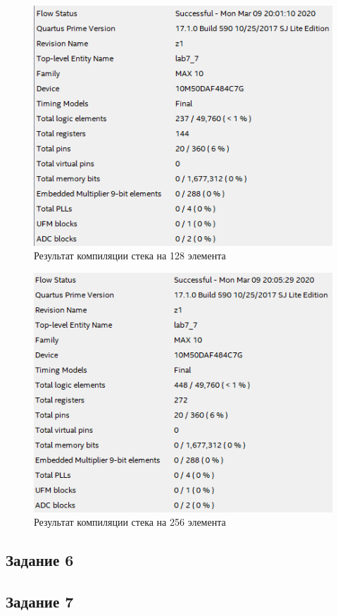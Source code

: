 \documentclass[a4paper,14pt]{article}
\begin{document}
	\begin{figure}[H]
		\centering
		\includegraphics[width=0.8\linewidth]{images/z5_res_128}
		\caption{Результат компиляции стека на 128 элемента}
		\label{fig:z5_res_128}
	\end{figure}
	
	\begin{figure}[H]
		\centering
		\includegraphics[width=0.8\linewidth]{images/z5_res_256}
		\caption{Результат компиляции стека на 256 элемента}
		\label{fig:z5_res_256}
	\end{figure}
	\subsection{Задание 6}
	
	\subsection{Задание 7}
	
\end{document}

